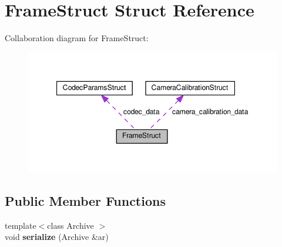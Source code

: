 \hypertarget{structFrameStruct}{}\section{Frame\+Struct Struct Reference}
\label{structFrameStruct}


Collaboration diagram for Frame\+Struct\+:
\nopagebreak
\begin{figure}[H]
\begin{center}
\leavevmode
\includegraphics[width=347pt]{structFrameStruct__coll__graph}
\end{center}
\end{figure}
\subsection*{Public Member Functions}
\begin{DoxyCompactItemize}
\item 
\mbox{\label{structFrameStruct_a4657a6687d0e0d0984419954da4a2c62}} 
{\footnotesize template$<$class Archive $>$ }\\void {\bfseries serialize} (Archive \&ar)
\end{DoxyCompactItemize}
